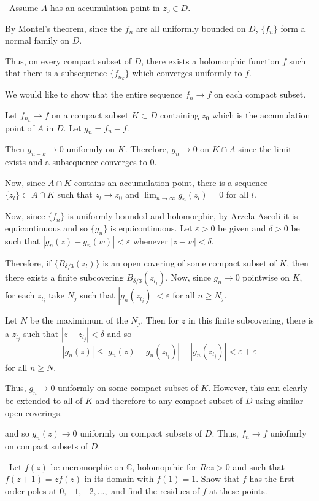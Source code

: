 \documentclass[12pt]{Qual}
\begin{document}
\begin{solution}$\,$
Assume $A$ has an accumulation point in $z_0\in D.$

By Montel's theorem, since the $f_n$ are all uniformly bounded on $D$, $\{f_n\}$ form a normal family on $D$.

Thus, on every compact subset of $D$, there exists a holomorphic function $f$ such that there is a subsequence $\{f_{n_k}\}$ which converges uniformly to $f.$

We would like to show that the entire sequence $f_n\to f$ on each compact subset.

Let $f_{n_k}\to f$ on a compact subset $K\subset D$ containing $z_0$ which is the accumulation point of $A$ in $D$. Let $g_n=f_n-f$.

Then $g_{n-k}\to0$ uniformly on $K.$ Therefore, $g_n\to 0$ on $K\cap A$ since the limit exists and a subsequence converges to $0$.

Now, since $A\cap K$ contains an accumulation point, there is a sequence $\{z_l\}\subset A\cap K$ such that $z_l\to z_0$ and $\lim_{n\to\infty}g_n(z_l)=0$ for all $l$.

Now, since $\{f_n\}$ is uniformly bounded and holomorphic, by Arzela-Ascoli it is equicontinuous and so $\{g_n\}$ is equicontinuous. Let $\varepsilon>0$ be given and $\delta>0$ be such that $|g_n(z)-g_n(w)|<\varepsilon$ whenever $|z-w|<\delta.$

Therefore, if $\{B_{\delta/3}(z_l)\}$ is an open covering of some compact subset of $K$, then there exists a finite subcovering $B_{\delta/3}(z_{l_j})$. Now, since $g_n\to0$ pointwise on $K$, for each $z_{l_j}$ take $N_j$ such that $|g_n(z_{l_j})|<\varepsilon$ for all $n\ge N_j$.

Let $N$ be the maximimum of the $N_j$. Then for $z$ in this finite subcovering, there is a $z_{l_j}$ such that $|z-z_{l_j}|<\delta$ and so $$|g_n(z)|\le|g_n(z)-g_n(z_{l_j})|+|g_n(z_{l_j})|<\varepsilon+\varepsilon$$ for all $n\ge N$.

Thus, $g_n\to0$ uniformly on some compact subset of $K.$ However, this can clearly be extended to all of $K$ and therefore to any compact subset of $D$ using similar open coverings.

and so $g_n(z)\to0$ uniformly on compact subsets of $D$. Thus, $f_n\to f$ uniofmrly on compact subsets of $D.$
\end{solution}
\newpage





\begin{problem} $\,$
Let $f(z)$ be meromorphic on $\mathbb{C}$, holomoprhic for $Re z>0$ and such that $f(z+1)=zf(z)$ in its domain with $f(1)=1$. Show that $f$ has the first order poles at $0,-1,-2,...,$ and find the residues of $f$ at these points.
\end{problem}
\end{document}
